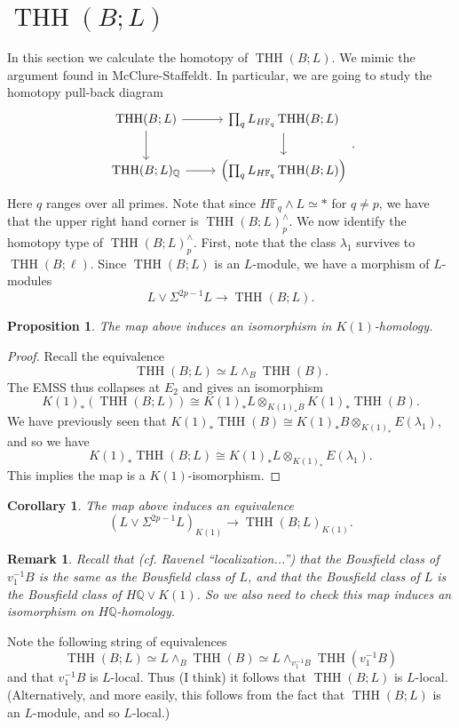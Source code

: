 \documentclass[12pt]{amsart}
\newcommand{\Q}{\mathbb{Q}}
\newcommand{\F}{\mathbb{F}}
\DeclareMathOperator{\THH}{THH}
\newtheorem{cor}[equation]{Corollary}
\newtheorem{prop}[equation]{Proposition}
\newtheorem{rem}[equation]{Remark}
\theoremstyle{definition}
\numberwithin{equation}{section}
\numberwithin{figure}{section}
\begin{document}
\section{$\THH(B;L)$}

In this section we calculate the homotopy of $\THH(B;L)$. We mimic the argument found in McClure-Staffeldt. In particular, we are going to study the homotopy pull-back diagram
\[
\begin{tikzcd}
	\THH(B;L)\arrow[r]\arrow[d] & \prod_{q} L_{H\F_q}\THH(B;L)\arrow[d]\\
	\THH(B;L)_{\Q} \arrow[r] & \left(\prod_qL_{H\F_q}\THH(B;L)\right)
\end{tikzcd}.
\]
Here $q$ ranges over all primes. Note that since $H\F_q\wedge L\simeq *$ for $q\neq p$, we have that the upper right hand corner is $\THH(B;L)^\wedge_p$. We now identify the homotopy type of $\THH(B;L)^\wedge_p$. First, note that the class $\lambda_1$ survives to $\THH(B;\ell)$. Since $\THH(B;L)$ is an $L$-module, we have a morphism of $L$-modules
\[
L\vee \Sigma^{2p-1}L\to \THH(B;L). 
\]

\begin{prop}
	The map above induces an isomorphism in $K(1)$-homology. 
\end{prop}
\begin{proof}
	Recall the equivalence
	\[
	\THH(B;L)\simeq L\wedge_B\THH(B).
	\]
	The EMSS thus collapses at $E_2$ and gives an isomorphism
	\[
	K(1)_*(\THH(B;L))\cong K(1)_*L\otimes_{K(1)_*B}K(1)_*\THH(B).
	\]
	We have previously seen that $K(1)_*\THH(B)\cong K(1)_*B\otimes_{K(1)_*} E(\lambda_1)$, and so we have 
	\[
	K(1)_*\THH(B;L)\cong K(1)_*L\otimes_{K(1)_*}E(\lambda_1). 
	\]
	This implies the map is a $K(1)$-isomorphism. 
\end{proof}

\begin{cor}
	The map above induces an equivalence
	\[
	(L\vee \Sigma^{2p-1}L)_{K(1)}\to \THH(B;L)_{K(1)}. 
	\]
\end{cor}

\begin{rem}
	Recall that (cf. Ravenel ``localization...'') that the Bousfield class of $v_1^{-1}B$ is the same as the Bousfield class of $L$, and that the Bousfield class of $L$ is the Bousfield class of $H\Q\vee K(1)$. So we also need to check this map induces an isomorphism on $H\Q$-homology. 
\end{rem}

Note the following string of equivalences 
\[
\THH(B;L)\simeq L\wedge_B\THH(B)\simeq L\wedge_{v_1^{-1}B}\THH(v_1^{-1}B)
\]
and that $v_1^{-1}B$ is $L$-local. Thus (I think) it follows that $\THH(B;L)$ is $L$-local. (Alternatively, and more easily, this follows from the fact that $\THH(B;L)$ is an $L$-module, and so $L$-local.)
\end{document}
